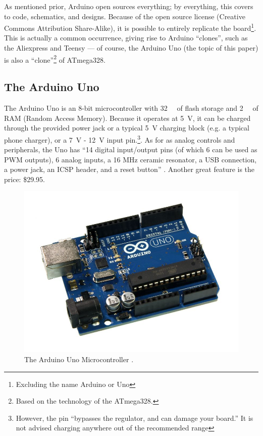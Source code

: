 \documentclass[11pt,letterpaper,twocolumn]{article}
\begin{document}
As mentioned prior, Arduino open sources everything; by everything, this covers to code, schematics, and designs. Because of the open source license (Creative Commons Attribution Share-Alike), it is possible to entirely replicate the board\footnote{Excluding the name Arduino or Uno}. This is actually a common occurrence, giving rise to Arduino ``clones'', such as the Aliexpress and Teensy --- of course, the Arduino Uno (the topic of this paper) is also a ``clone''\footnote{Based on the technology of the ATmega328.} of ATmega328.

\subsection{The Arduino Uno}
The Arduino Uno is an 8-bit microcontroller with \SI{32}{\kilo\byte} of flash storage and \SI{2}{\kilo\byte} of RAM (Random Access Memory). Because it operates at \SI{5}{\volt}, it can be charged through the provided power jack or a typical \SI{5}{\volt} charging block (e.g. a typical phone charger), or a \SI{7}{\volt} - \SI{12}{\volt} input pin.\footnote{However, the pin ``bypasses the regulator, and can damage your board.'' It is not advised charging anywhere out of the recommended range}. As for as analog controls and peripherals, the Uno has ``14 digital input/output pins (of which 6 can be used as PWM outputs), 6 analog inputs, a 16 MHz ceramic resonator, a USB connection, a power jack, an ICSP header, and a reset button'' \cite{specs}. Another great feature is the price: \$\num{29.95}.

\begin{figure}[!h]
    \centering
    \includegraphics[width=.90\columnwidth]{arduino-uno.jpg}
    \caption{The Arduino Uno Microcontroller \cite{image}.}
\end{figure}
\end{document}
